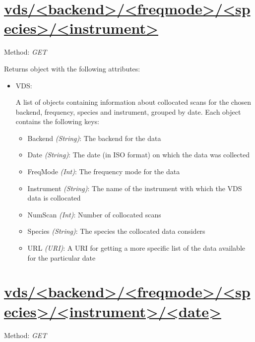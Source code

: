 \section{\url{vds/<backend>/<freqmode>/<species>/<instrument>}}
Method: \emph{GET}

Returns object with the following attributes:
\begin{itemize}
    \item VDS:

        A list of objects containing information about collocated scans for
        the chosen backend, frequency, species and instrument, grouped by date.
        Each object contains the following keys:

        \begin{itemize}
            \item Backend \emph{(String)}: The backend for the data
            \item Date \emph{(String)}: The date (in ISO format) on which the
                data was collected
            \item FreqMode \emph{(Int)}: The frequency mode for the data
            \item Instrument \emph{(String)}: The name of the instrument with
                which the VDS data is collocated
            \item NumScan \emph{(Int)}: Number of collocated scans
            \item Species \emph{(String)}: The species the collocated data
                considers
            \item URL \emph{(URI)}: A URI for getting a more specific list of
                the data available for the particular date
        \end{itemize}
\end{itemize}


\section{\url{vds/<backend>/<freqmode>/<species>/<instrument>/<date>}}
Method: \emph{GET}

